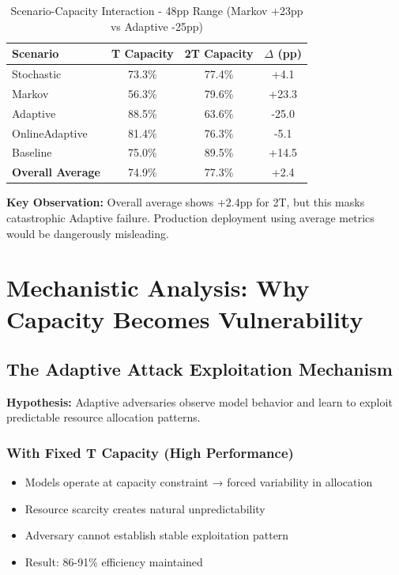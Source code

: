 \documentclass[11pt,a4paper]{article}
\begin{document}
\vspace{-0.4cm}

\begin{table}[H]
\scriptsize
\centering
\begin{tabular}{lccc}
\toprule
\textbf{Scenario} & \textbf{T Capacity} & \textbf{2T Capacity} & \textbf{$\Delta$ (pp)} \\
\midrule
Stochastic & 73.3\% & 77.4\% & +4.1 \\
Markov & 56.3\% & 79.6\% & +23.3 \\
Adaptive & 88.5\% & 63.6\% & -25.0 \\
OnlineAdaptive & 81.4\% & 76.3\% & -5.1 \\
Baseline & 75.0\% & 89.5\% & +14.5 \\
\midrule
\textbf{Overall Average} & 74.9\% & 77.3\% & +2.4 \\
\bottomrule
\end{tabular}
\vspace{-0.2cm}
\caption{Scenario-Capacity Interaction - 48pp Range (Markov +23pp vs Adaptive -25pp)}
\end{table}

\vspace{-0.2cm}

\textbf{Key Observation:} Overall average shows +2.4pp for 2T, but this masks catastrophic Adaptive failure. Production deployment using average metrics would be dangerously misleading.

\section{Mechanistic Analysis: Why Capacity Becomes Vulnerability}

\subsection{The Adaptive Attack Exploitation Mechanism}

\textbf{Hypothesis:} Adaptive adversaries observe model behavior and learn to exploit predictable resource allocation patterns.

\subsubsection{With Fixed T Capacity (High Performance)}
\begin{itemize}
\item Models operate at capacity constraint → forced variability in allocation
\item Resource scarcity creates natural unpredictability
\item Adversary cannot establish stable exploitation pattern
\item Result: 86-91\% efficiency maintained
\end{itemize}
\end{document}
